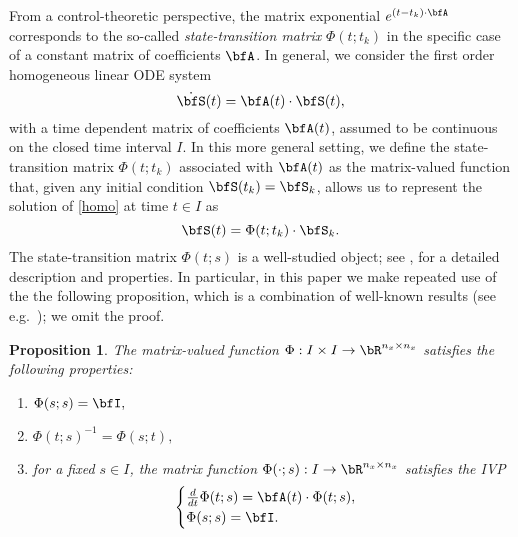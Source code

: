 \documentclass[DIV=12]{scrartcl} %
\newtheorem{proposition}{Proposition}
\theoremstyle{definition}
\begin{document}
From a control-theoretic perspective, the matrix exponential $e^{(t-t_k)\cdot \bfA}$ corresponds to the so-called \textit{state-transition matrix} $\Phi(t;t_k)$ in the specific case of a constant matrix of coefficients $\bfA$. In general, we consider the first order homogeneous linear ODE system
\begin{equation}
    \label{homo}
\dot{\bfS}(t)=\bfA(t)\cdot \bfS(t),
\end{equation}
with a time dependent matrix of coefficients $\bfA(t)$, assumed to be continuous on the closed time interval $I$. In this more general setting, we define the state-transition matrix $\Phi(t;t_k)$ associated with $\bfA(t)$ as the matrix-valued function that, given any initial condition $\bfS(t_k)=\bfS_k$, allows us to represent the solution of \eqref{homo} at time $t\in I$ as
\[
\bfS(t) = \Phi(t;t_k)\cdot \bfS_k.
\]
The state-transition matrix $\Phi(t;s)$ is a well-studied object; see \cite{RughWilsonJ1993Lst},  \cite[Chap.~1, Sect.~3]{BrockettRogerW.2015Fdls} for a detailed description and properties. In particular, in this paper we make repeated use of the the following proposition, which is a combination of well-known results (see e.g.\ \cite{BrockettRogerW.2015Fdls, RughWilsonJ1993Lst}); we omit the proof.
\begin{proposition}
\label{prop:Phi}
The matrix-valued function $\Phi:I\times I\to\bR^{n_x\times n_x}$ satisfies the following properties: 
\begin{enumerate}
    \item\label{itm:first} $\Phi(s;s) = \bfI,$
    \item\label{itm:second} $\Phi(t;s)^{-1} = \Phi(s;t),$
    \item\label{itm:third} for a fixed $s\in I$, the matrix function $\Phi(\cdot;s):I\to\bR^{n_x\times n_x}$ satisfies the IVP 
    \begin{equation*}
        \begin{cases}
        \frac{d}{dt}\Phi(t;s)=\bfA(t)\cdot\Phi(t;s),\\
        \Phi(s;s)=\bfI.
        \end{cases}
    \end{equation*}
\end{enumerate}
\end{proposition}
\end{document}
